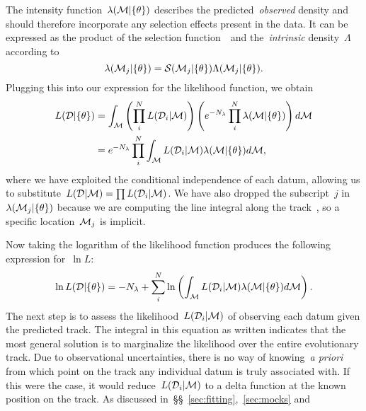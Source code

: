 \documentclass[ms.tex]{subfiles}
\begin{document}
The intensity function~$\lambda(\mathcal{M} | \{\theta\})$ describes the
predicted~\textit{observed} density and should therefore incorporate any
selection effects present in the data.
It can be expressed as the product of the selection function~~and
the~\textit{intrinsic} density~$\Lambda$ according to
\begin{equation}
\lambda(\mathcal{M}_j | \{\theta\}) = \mathcal{S}(\mathcal{M}_j | \{\theta\})
\Lambda(\mathcal{M}_j | \{\theta\}).
\end{equation}
Plugging this into our expression for the likelihood function, we obtain
\begin{subequations}\begin{align}
L(\mathcal{D} | \{\theta\}) &= \int_{\mathcal{M}}
\left(\prod_i^N L(\mathcal{D}_i | \mathcal{M})\right)
\left(e^{-N_\lambda} \prod_i^N \lambda(\mathcal{M} | \{\theta\})\right)
d\mathcal{M}
\\
&= e^{-N_\lambda} \prod_i^N \int_{\mathcal{M}} L(\mathcal{D}_i | \mathcal{M})
\lambda(\mathcal{M} | \{\theta\}) d\mathcal{M},
\end{align}\end{subequations}
where we have exploited the conditional independence of each datum, allowing us
to substitute~$L(\mathcal{D} | \mathcal{M}) = \prod L(\mathcal{D}_i |
\mathcal{M})$.
We have also dropped the subscript~$j$ in~$\lambda(\mathcal{M}_j | \{\theta\})$
because we are computing the line integral along the track~, so a
specific location~$\mathcal{M}_j$ is implicit.
\par
Now taking the logarithm of the likelihood function produces the following
expression for~$\ln L$:
\begin{equation}
\ln L(\mathcal{D} | \{\theta\}) = -N_\lambda + \sum_i^N \ln \left(
\int_{\mathcal{M}} L(\mathcal{D}_i | \mathcal{M})\lambda(\mathcal{M} | \{\theta\})
d\mathcal{M}
\right).
\label{eq:lnL_with_integral}
\end{equation}
The next step is to assess the likelihood~$L(\mathcal{D}_i | \mathcal{M})$ of
observing each datum given the predicted track.
The integral in this equation as written indicates that the most general
solution is to marginalize the likelihood over the entire evolutionary track.
Due to observational uncertainties, there is no way of knowing~\textit{a priori}
from which point on the track any individual datum is truly associated with.
If this were the case, it would reduce~$L(\mathcal{D}_i | \mathcal{M})$ to a
delta function at the known position on the track.
As discussed in~\S\S~\ref{sec:fitting},~\ref{sec:mocks} and
\end{document}
